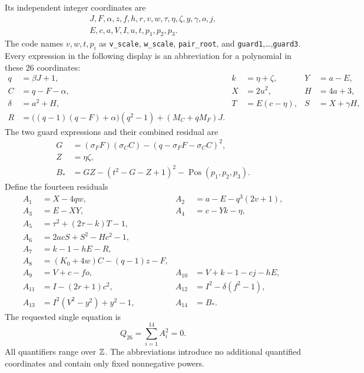 Its independent integer coordinates are
\[
\begin{gathered}
 J,F,\alpha,z,f,h,r,v,w,\tau,\eta,\zeta,y,\gamma,o,j,\\
 E,c,a,V,I,u,t,p_1,p_2,p_3.
\end{gathered}
\]
The code names $v,w,t,p_i$ as \texttt{v\_scale}, \texttt{w\_scale},
\texttt{pair\_root}, and \texttt{guard1},\ldots,\texttt{guard3}.
Every expression in the following display is an abbreviation for a
polynomial in these 26 coordinates:
\begin{align*}
 q&=\beta J+1, & k&=\eta+\zeta, & Y&=a-E,\\
 C&=q-F-\alpha, & X&=2u^2, & H&=4a+3,\\
 \delta&=a^2+H, & T&=E(c-\eta), & S&=X+\gamma H,\\
 R&=\bigl((q-1)(q-F)+\alpha\bigr)(q^2-1)
       +(M_C+qM_F)J.&&&
\end{align*}
The two guard expressions and their combined residual are
\begin{align*}
 G&=(\sigma_F F)(\sigma_C C)
       -(q-\sigma_F F-\sigma_C C)^2,\\
 Z&=\eta\zeta,\\
 B_*&=GZ-(t^2-G-Z+1)^2-\operatorname{Pos}(p_1,p_2,p_3).
\end{align*}
Define the fourteen residuals
\begin{align}
 A_1&=X-4qw, & A_2&=a-E-q^3(2v+1),\nonumber\\
 A_3&=E-XY, & A_4&=c-Yk-\eta,\nonumber\\
 A_5&=\tau^2+(2\tau-k)T-1,&&\nonumber\\
 A_6&=2acS+S^2-Hc^2-1,&&\nonumber\\
 A_7&=k-1-hE-R,&&\nonumber\\
 A_8&=(K_0+4w)C-(q-1)z-F,&&\nonumber\\
 A_9&=V+c-fo, & A_{10}&=V+k-1-cj-hE,\nonumber\\
 A_{11}&=I-(2r+1)c^2, & A_{12}&=I^2-\delta(f^2-1),\nonumber\\
 A_{13}&=I^2(V^2-y^2)+y^2-1, & A_{14}&=B_*.
 \label{eq:int26rows}
\end{align}
The requested single equation is
\begin{equation}
 \boxed{\displaystyle Q_{26}=\sum_{i=1}^{14}A_i^2=0.}
 \label{eq:int26}
\end{equation}
All quantifiers range over $\mathbb Z$.  The abbreviations introduce no additional
quantified coordinates and contain only fixed nonnegative powers.

